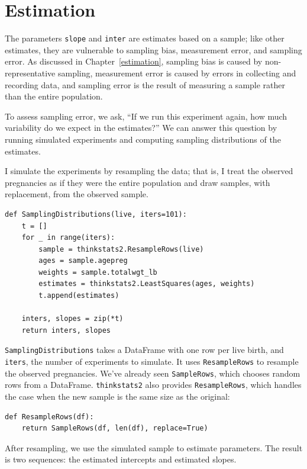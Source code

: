 \documentclass[12pt]{book}
\begin{document}
\section{Estimation}
\label{regest}

The parameters {\tt slope} and {\tt inter} are estimates based on a
sample; like other estimates, they are vulnerable to sampling bias,
measurement error, and sampling error.  As discussed in
Chapter~\ref{estimation}, sampling bias is caused by non-representative
sampling, measurement error is caused by errors in collecting
and recording data, and sampling error is the result of measuring a
sample rather than the entire population.

To assess sampling error, we ask, ``If we run this experiment again,
how much variability do we expect in the estimates?''  We can
answer this question by running simulated experiments and computing
sampling distributions of the estimates.

I simulate the experiments by resampling the data; that is, I treat
the observed pregnancies as if they were the entire population
and draw samples, with replacement, from the observed sample.

\begin{verbatim}
def SamplingDistributions(live, iters=101):
    t = []
    for _ in range(iters):
        sample = thinkstats2.ResampleRows(live)
        ages = sample.agepreg
        weights = sample.totalwgt_lb
        estimates = thinkstats2.LeastSquares(ages, weights)
        t.append(estimates)

    inters, slopes = zip(*t)
    return inters, slopes
\end{verbatim}

{\tt SamplingDistributions} takes a DataFrame with one row per live
birth, and {\tt iters}, the number of experiments to simulate.  It
uses {\tt ResampleRows} to resample the observed pregnancies.  We've
already seen {\tt SampleRows}, which chooses random rows from a
DataFrame.  {\tt thinkstats2} also provides {\tt ResampleRows}, which
handles the case when the new sample is the same size as the original:

\begin{verbatim}
def ResampleRows(df):
    return SampleRows(df, len(df), replace=True)
\end{verbatim}

After resampling, we use the simulated sample to estimate parameters.
The result is two sequences: the estimated intercepts and estimated
slopes.
\end{document}
